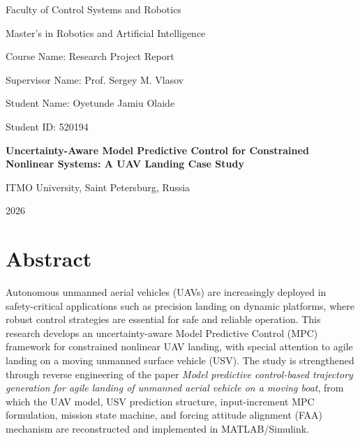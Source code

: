 \documentclass[12pt,a4paper]{report}
\begin{document}
\begin{titlepage}
\centering
\vspace*{1.0cm}
{\Large Faculty of Control Systems and Robotics\par}
\vspace{0.3cm}
{\large Master's in Robotics and Artificial Intelligence\par}
\vspace{1.2cm}
{\large Course Name: Research Project Report\par}
\vspace{0.3cm}
{\large Supervisor Name: Prof. Sergey M. Vlasov\par}
\vspace{0.3cm}
{\large Student Name: Oyetunde Jamiu Olaide\par}
\vspace{0.3cm}
{\large Student ID: 520194\par}
\vfill
{\Huge\bfseries Uncertainty-Aware Model Predictive Control for Constrained Nonlinear Systems: A UAV Landing Case Study\par}
\vfill
{\large ITMO University, Saint Petersburg, Russia\par}
\vspace{0.3cm}
{\large 2026\par}
\end{titlepage}


\chapter*{Abstract}
Autonomous unmanned aerial vehicles (UAVs) are increasingly deployed in safety-critical applications such as precision landing on dynamic platforms, where robust control strategies are essential for safe and reliable operation. This research develops an uncertainty-aware Model Predictive Control (MPC) framework for constrained nonlinear UAV landing, with special attention to agile landing on a moving unmanned surface vehicle (USV). The study is strengthened through reverse engineering of the paper \emph{Model predictive control-based trajectory generation for agile landing of unmanned aerial vehicle on a moving boat}, from which the UAV model, USV prediction structure, input-increment MPC formulation, mission state machine, and forcing attitude alignment (FAA) mechanism are reconstructed and implemented in MATLAB/Simulink.
\end{document}
